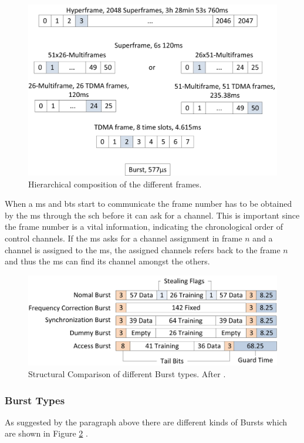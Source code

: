 \begin{figure}
	\centering
	\includegraphics{../Images/Frames}
	\caption{Hierarchical composition of the different frames.}
	\label{fig:frame_hierarchy}
\end{figure}

When a \gls{ms} and \gls{bts} start to communicate the frame number has to be obtained by the \gls{ms} through the \gls{sch} before it can ask for a channel.
This is important since the frame number is a vital information, indicating the chronological order of control channels.
If the \gls{ms} asks for a channel assignment in frame $n$ and a channel is assigned to the \gls{ms}, the assigned channels refers back to the frame $n$ and thus the \gls{ms} can find its channel amongst the others.

\begin{figure}
	\centering
	\includegraphics{../Images/Bursts}
	\caption{Structural Comparison of different Burst types. After \cite{GSM2009}.}
	\label{fig:burst_types}
\end{figure}

\subsubsection{Burst Types}
As suggested by the paragraph above there are different kinds of Bursts which are shown in Figure \ref{fig:burst_types} \cite{GSM2009}.

